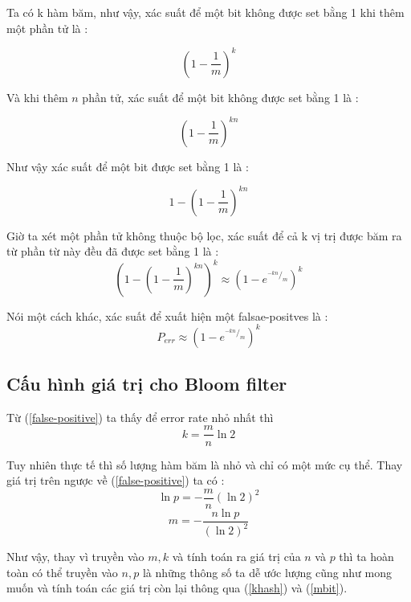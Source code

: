 Ta có k hàm băm, như vậy, xác suất để một bit không được set bằng 1 khi thêm một phần tử là :
\begin{large}
\[ {(1 - \dfrac{1}{m})}^{k} \]
\end{large}

Và khi thêm $n$ phần tử, xác suất để một bit không được set bằng 1 là :
\begin{large}
\[ {(1 - \dfrac{1}{m})}^{kn} \]
\end{large}

Như vậy xác suất để một bit được set bằng 1 là :
\begin{large}
\[ 1 - {(1 - \dfrac{1}{m})}^{kn} \]
\end{large}
Giờ ta xét một phần tử không thuộc bộ lọc, xác suất để cả k vị trị được băm ra từ phần từ này đều đã được set bằng 1 là : 
\begin{equation}
{\left( 1 - {\left( 1 - \dfrac{1}{m}\right) }^{kn}\right) }^{k} \approx {\left( 1 - e^{^{-kn}/_{m}}\right)}^{k}
\end{equation}

Nói một cách khác, xác suất để xuất hiện một falsae-positves là :
\begin{equation} \label{false-positive}
P_{err} \approx {\left( 1 - e^{^{-kn}/_{m}}\right)}^{k}
\end{equation}

\subsection{Cấu hình giá trị cho Bloom filter}
Từ (\ref{false-positive}) ta thấy để error rate nhỏ nhất thì 
\begin{equation} \label{khash}
k = \dfrac{m}{n} \ln{2}
\end{equation}

Tuy nhiên thực tế thì số lượng hàm băm là nhỏ và chỉ có một mức cụ thể. Thay giá trị trên ngược về (\ref{false-positive}) ta có : 
\begin{equation} \label{perror}
\ln{p} = - \dfrac{m}{n} (\ln{2})^2
\end{equation}
\begin{equation} \label{mbit}
m = - \dfrac{n\ln{p}}{(\ln{2})^2} 
\end{equation}

Như vậy, thay vì truyền vào $m, k$ và tính toán ra giá trị của $n$ và $p$ thì ta hoàn toàn có thể truyền vào $n,p$ là những thông số ta dễ ước lượng cũng như mong muốn và tính toán các giá trị còn lại thông qua (\ref{khash}) và (\ref{mbit}). 


